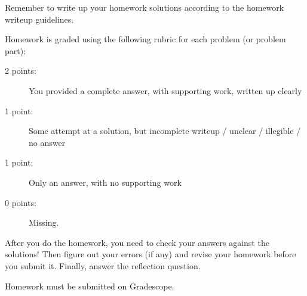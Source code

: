 \documentclass[11pt, oneside]{article}   	%
\begin{document}
\hrulefill

Remember to write up your homework solutions according to the homework writeup guidelines. 

Homework is graded using the following rubric for each problem (or problem part):

\begin{description}
\item[2 points:] You provided a complete answer, with supporting work, written up clearly
\item[1 point:] Some attempt at a solution, but incomplete writeup / unclear / illegible / no answer
\item[1 point:] Only an answer, with no supporting work 
\item[0 points:] Missing.
\end{description}

After you do the homework, you need to check your answers against the solutions! Then figure out your errors (if any) and revise your homework before you submit it. Finally, answer the reflection question.

Homework must be submitted on Gradescope.
\end{document}
